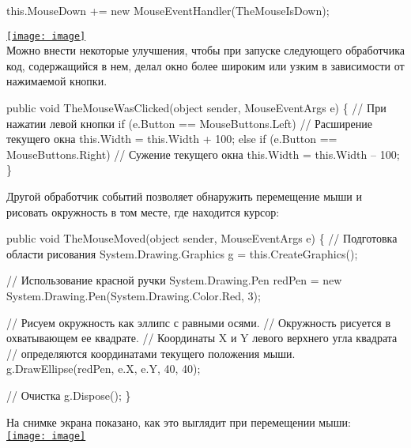 \documentclass[12pt, a4paper]{article}
\begin{document}
\begin{spverbatim}this.MouseDown += new MouseEventHandler(TheMouseIsDown);\end{spverbatim}


\bigbreak \href{http://www.intuit.ru//EDI/25_09_16_1/1474755579-437/tutorial/590/objects/3/files/02-28.jpg}                         {\texttt{[image: image]}}\\



Можно внести некоторые улучшения, чтобы при запуске следующего обработчика код, содержащийся в нем, делал окно более широким или узким в зависимости от нажимаемой кнопки.\\

\begin{spverbatim}public void TheMouseWasClicked(object sender, MouseEventArgs e)
\{
    // При нажатии левой кнопки
    if (e.Button == MouseButtons.Left)
        // Расширение текущего окна
        this.Width = this.Width + 100;
    else if (e.Button == MouseButtons.Right)
        // Сужение текущего окна
        this.Width = this.Width – 100;
\}\end{spverbatim}

Другой обработчик событий позволяет обнаружить перемещение мыши и рисовать окружность в том месте, где находится курсор:\\

\begin{spverbatim}public void TheMouseMoved(object sender, MouseEventArgs e)
\{
    // Подготовка области рисования
    System.Drawing.Graphics g = this.CreateGraphics();
    
    // Использование красной ручки
    System.Drawing.Pen redPen = new System.Drawing.Pen(System.Drawing.Color.Red, 3);
    
    // Рисуем окружность как эллипс с равными осями.
    // Окружность рисуется в охватывающем ее квадрате.
    // Координаты X и Y левого верхнего угла квадрата
    // определяются координатами текущего положения мыши.
    g.DrawEllipse(redPen, e.X, e.Y, 40, 40);
    
    // Очистка
    g.Dispose();
\}\end{spverbatim}

На снимке экрана показано, как это выглядит при перемещении мыши:\\


\bigbreak \href{http://www.intuit.ru//EDI/25_09_16_1/1474755579-437/tutorial/590/objects/3/files/02-29.jpg}                         {\texttt{[image: image]}}\\
\end{document}
